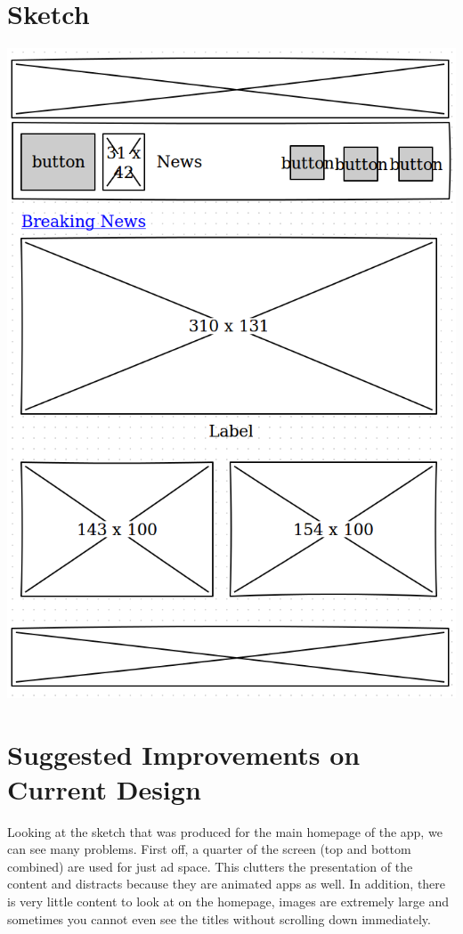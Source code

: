 \documentclass[a4paper, 11pt]{article}
\begin{document}
\section*{Sketch}
\includegraphics[scale=0.25]{sketch.png}

\section*{Suggested Improvements on Current Design}
Looking at the sketch that was produced for the main homepage of the app, we can see many problems.  First off, a quarter of the screen (top and bottom combined) are used for just ad space.  This clutters the presentation of the content and distracts because they are animated apps as well.  In addition, there is very little content to look at on the homepage, images are extremely large and sometimes you cannot even see the titles without scrolling down immediately.\\
\end{document}
